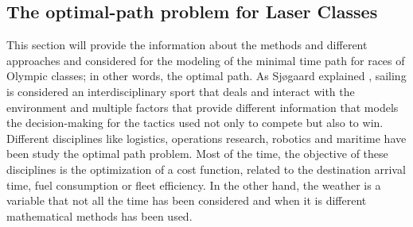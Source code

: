 
\subsection{The optimal-path problem for Laser Classes}
This section will provide the information about the methods and different approaches and considered for the modeling of the minimal time path for races of Olympic classes; in other words, the optimal path.  As Sjøgaard explained \cite{sjogaard2015science},  sailing is considered an interdisciplinary sport that deals and interact with the environment and multiple factors that provide different information that models the decision-making for the tactics used not only to compete but also to win.  Different disciplines like logistics, operations research, robotics and maritime have been study the optimal path problem. 
Most of the time, the objective of these disciplines is  the optimization of a cost function, related to the destination arrival time, fuel consumption or fleet efficiency. In the other hand, the weather is a variable that not all the time has been considered and when it is different mathematical methods has been used. %
